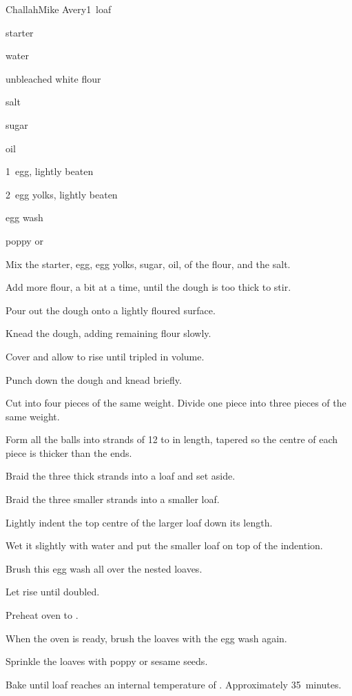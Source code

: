 \begin{recipe}{Challah}{Mike Avery}{1~loaf}

\begin{ingredients}
\item {} starter
\item \C{\half} water
\item {} unbleached white flour
\item {} salt
\item \C{\quarter} sugar
\item \C{\quarter} oil
\item 1~egg, lightly beaten
\item 2~egg yolks, lightly beaten
\item egg wash
\item poppy or 
\end{ingredients}

\begin{directions}
\item Mix the starter, egg, egg yolks, sugar, oil, \half{} of the flour, and the salt.
\item Add more flour, a bit at a time, until the dough is too thick to stir.
\item Pour out the dough onto a lightly floured surface.
\item Knead the dough, adding remaining flour slowly.
\item Cover and allow to rise until tripled in volume.
\item Punch down the dough and knead briefly.
\item Cut into four pieces of the same weight. Divide one piece into three pieces of the same weight.
\item Form all the balls into strands of 12 to  in length, tapered so the centre of each piece is thicker than the ends.
\item Braid the three thick strands into a loaf and set aside.
\item Braid the three smaller strands into a smaller loaf.
\item Lightly indent the top centre of the larger loaf down its length.
\item Wet it slightly with water and put the smaller loaf on top of the indention.
\item Brush this egg wash all over the nested loaves.
\item Let rise until doubled.
\item Preheat oven to .
\item When the oven is ready, brush the loaves with the egg wash again.
\item Sprinkle the loaves with poppy or sesame seeds.
\item Bake until loaf reaches an internal temperature of . Approximately 35~minutes.
\end{directions}

\end{recipe}
